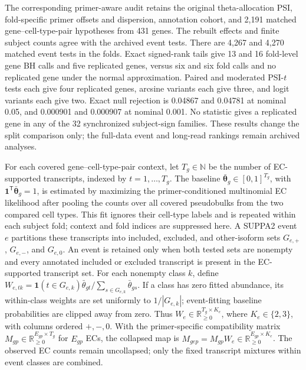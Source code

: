 \documentclass[11pt]{article}
\begin{document}
The corresponding primer-aware audit retains the original theta-allocation PSI, fold-specific primer offsets and dispersion, annotation cohort, and 2,191 matched gene--cell-type-pair hypotheses from 431 genes. The rebuilt effects and finite subject counts agree with the archived event tests. There are 4,267 and 4,270 matched event tests in the folds. Exact signed-rank tails give 13 and 16 fold-level gene BH calls and five replicated genes, versus six and six fold calls and no replicated gene under the normal approximation. Paired and moderated PSI-\(t\) tests each give four replicated genes, arcsine variants each give three, and logit variants each give two. Exact null rejection is 0.04867 and 0.04781 at nominal 0.05, and 0.000901 and 0.000907 at nominal 0.001. No statistic gives a replicated gene in any of the 32 synchronized subject-sign families. These results change the split comparison only; the full-data event and long-read rankings remain archived analyses.

For each covered gene--cell-type-pair context, let \(T_g\in\mathbb N\) be the number of EC-supported transcripts, indexed by \(t=1,\ldots,T_g\). The baseline \(\bar{\bm\theta}_g\in[0,1]^{T_g}\), with \(\bm 1^{\mathsf T}\bar{\bm\theta}_g=1\), is estimated by maximizing the primer-conditioned multinomial EC likelihood after pooling the counts over all covered pseudobulks from the two compared cell types. This fit ignores their cell-type labels and is repeated within each subject fold; context and fold indices are suppressed here. A SUPPA2 event \(e\) partitions these transcripts into included, excluded, and other-isoform sets \(G_{e,+}\), \(G_{e,-}\), and \(G_{e,0}\). An event is retained only when both tested sets are nonempty and every annotated included or excluded transcript is present in the EC-supported transcript set. For each nonempty class \(k\), define \(W_{e,tk}=\mathbf 1(t\in G_{e,k})\bar\theta_{gt}/\sum_{s\in G_{e,k}}\bar\theta_{gs}\). If a class has zero fitted abundance, its within-class weights are set uniformly to \(1/|G_{e,k}|\); event-fitting baseline probabilities are clipped away from zero. Thus \(W_e\in\mathbb R_{\ge0}^{T_g\times K_e}\), where \(K_e\in\{2,3\}\), with columns ordered \(+,-,0\). With the primer-specific compatibility matrix \(M_{gp}\in\mathbb R_{\ge0}^{E_{gp}\times T_g}\) for \(E_{gp}\) ECs, the collapsed map is \(M_{gep}=M_{gp}W_e\in\mathbb R_{\ge0}^{E_{gp}\times K_e}\). The observed EC counts remain uncollapsed; only the fixed transcript mixtures within event classes are combined.
\end{document}
